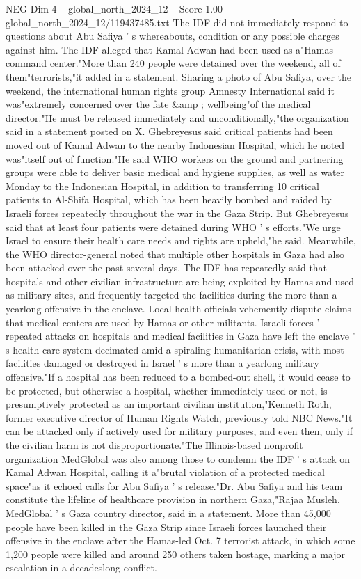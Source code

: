 \begin{textsample}{NEG Dim 4 – global\_north\_2024\_12 – Score 1.00 – global\_north\_2024\_12/119437485.txt}
The IDF did not immediately respond to questions about Abu Safiya ' s whereabouts, condition or any possible charges against him.
The IDF alleged that Kamal Adwan had been used as a"Hamas command center."More than 240 people were detained over the weekend, all of them"terrorists,"it added in a statement.
Sharing a photo of Abu Safiya, over the weekend, the international human rights group Amnesty International said it was"extremely concerned over the fate \&amp ; wellbeing"of the medical director."He must be released immediately and unconditionally,"the organization said in a statement posted on X.
Ghebreyesus said critical patients had been moved out of Kamal Adwan to the nearby Indonesian Hospital, which he noted was"itself out of function."He said WHO workers on the ground and partnering groups were able to deliver basic medical and hygiene supplies, as well as water Monday to the Indonesian Hospital, in addition to transferring 10 critical patients to Al-Shifa Hospital, which has been heavily bombed and raided by Israeli forces repeatedly throughout the war in the Gaza Strip.
But Ghebreyesus said that at least four patients were detained during WHO ' s efforts."We urge Israel to ensure their health care needs and rights are upheld,"he said.
Meanwhile, the WHO director-general noted that multiple other hospitals in Gaza had also been attacked over the past several days.
The IDF has repeatedly said that hospitals and other civilian infrastructure are being exploited by Hamas and used as military sites, and frequently targeted the facilities during the more than a yearlong offensive in the enclave.
Local health officials vehemently dispute claims that medical centers are used by Hamas or other militants.
Israeli forces ' repeated attacks on hospitals and medical facilities in Gaza have left the enclave ' s health care system decimated amid a spiraling humanitarian crisis, with most facilities damaged or destroyed in Israel ' s more than a yearlong military offensive."If a hospital has been reduced to a bombed-out shell, it would cease to be protected, but otherwise a hospital, whether immediately used or not, is presumptively protected as an important civilian institution,"Kenneth Roth, former executive director of Human Rights Watch, previously told NBC News."It can be attacked only if actively used for military purposes, and even then, only if the civilian harm is not disproportionate."The Illinois-based nonprofit organization MedGlobal was also among those to condemn the IDF ' s attack on Kamal Adwan Hospital, calling it a"brutal violation of a protected medical space"as it echoed calls for Abu Safiya ' s release."Dr.
Abu Safiya and his team constitute the lifeline of healthcare provision in northern Gaza,"Rajaa Musleh, MedGlobal ' s Gaza country director, said in a statement.
More than 45,000 people have been killed in the Gaza Strip since Israeli forces launched their offensive in the enclave after the Hamas-led Oct. 7 terrorist attack, in which some 1,200 people were killed and around 250 others taken hostage, marking a major escalation in a decadeslong conflict.

\end{textsample}
